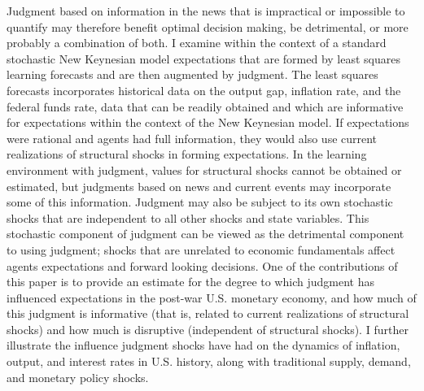 \documentclass[12pt]{article}
\begin{document}
Judgment based on information in the news that is impractical or impossible to quantify may therefore benefit optimal decision making, be detrimental, or more probably a combination of both.  I examine within the context of a standard stochastic New Keynesian model expectations that are formed by least squares learning forecasts and are then augmented by judgment.  The least squares forecasts incorporates historical data on the output gap, inflation rate, and the federal funds rate, data that can be readily obtained and which are informative for expectations within the context of the New Keynesian model.  If expectations were rational and agents had full information, they would also use current realizations of structural shocks in forming expectations.  In the learning environment with judgment, values for structural shocks cannot be obtained or estimated, but judgments based on news and current events may incorporate some of this information.  Judgment may also be subject to its own stochastic shocks that are independent to all other shocks and state variables.  This stochastic component of judgment can be viewed as the detrimental component to using judgment; shocks that are unrelated to economic fundamentals affect agents expectations and forward looking decisions.  One of the contributions of this paper is to provide an estimate for the degree to which judgment has influenced expectations in the post-war U.S. monetary economy, and how much of this judgment is informative (that is, related to current realizations of structural shocks) and how much is disruptive (independent of structural shocks).  I further illustrate the influence judgment shocks have had on the dynamics of inflation, output, and interest rates in U.S. history, along with traditional supply, demand, and monetary policy shocks.
\end{document}
